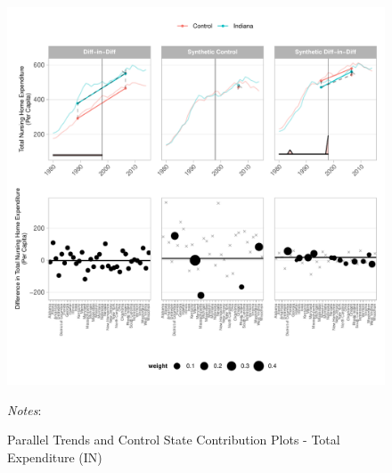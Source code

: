 \documentclass[12pt]{article}
\begin{document}
\newpage
\begin{figure}[t]
	\begin{center}
	\caption{\centering Parallel Trends and Control State Contribution Plots - Total Expenditure (IN)}
    \includegraphics[width=\textwidth,keepaspectratio]{total_expenditure_plots_IN.pdf}
    \end{center}
    \footnotesize
		\textit{Notes}:
\end{figure}
\clearpage
\end{document}
